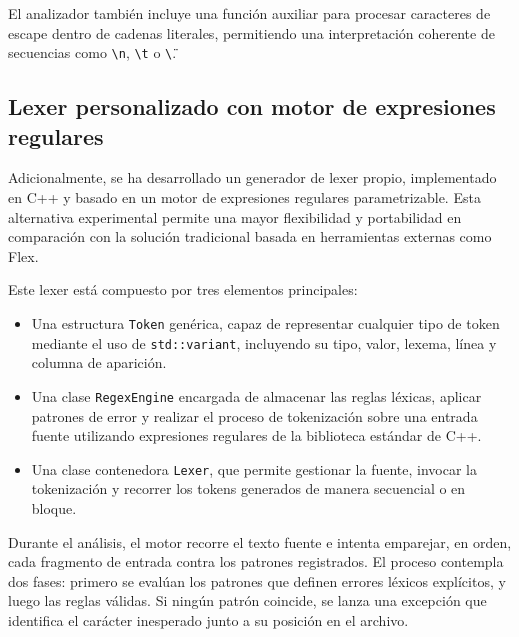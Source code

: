 \documentclass{llncs}
\begin{document}
	\begin{quote}
	\begin{center}
	\end{center}
	\end{quote}

	El analizador también incluye una función auxiliar para procesar caracteres de escape dentro de cadenas literales, permitiendo una interpretación coherente de secuencias como \texttt{\textbackslash n}, \texttt{\textbackslash t} o \texttt{\textbackslash\"}.

	\subsection{Lexer personalizado con motor de expresiones regulares}

	\vspace{1em}
	Adicionalmente, se ha desarrollado un generador de lexer propio, implementado en C++ y basado en un motor de expresiones regulares parametrizable. Esta alternativa experimental permite una mayor flexibilidad y portabilidad en comparación con la solución tradicional basada en herramientas externas como Flex.

	Este lexer está compuesto por tres elementos principales:

	\begin{itemize}
		\item Una estructura \texttt{Token} genérica, capaz de representar cualquier tipo de token mediante el uso de \texttt{std::variant}, incluyendo su tipo, valor, lexema, línea y columna de aparición.
		\item Una clase \texttt{RegexEngine} encargada de almacenar las reglas léxicas, aplicar patrones de error y realizar el proceso de tokenización sobre una entrada fuente utilizando expresiones regulares de la biblioteca estándar de C++.
		\item Una clase contenedora \texttt{Lexer}, que permite gestionar la fuente, invocar la tokenización y recorrer los tokens generados de manera secuencial o en bloque.
	\end{itemize}

	Durante el análisis, el motor recorre el texto fuente e intenta emparejar, en orden, cada fragmento de entrada contra los patrones registrados. El proceso contempla dos fases: primero se evalúan los patrones que definen errores léxicos explícitos, y luego las reglas válidas. Si ningún patrón coincide, se lanza una excepción que identifica el carácter inesperado junto a su posición en el archivo.
\end{document}
